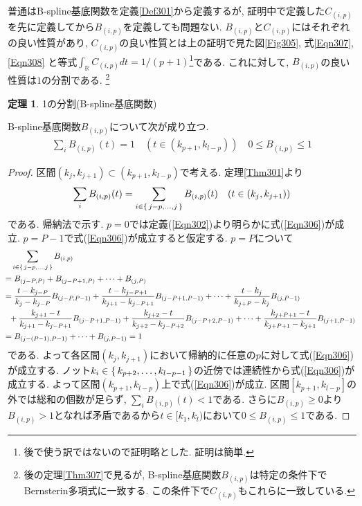 \documentclass{jsarticle}
\newcommand\setR{\mathbb{R}}
\newcommand\sfrac[2]{#1/#2}
\theoremstyle{definition}%
\newtheorem{thm}{定理}
\begin{document}
\newpage
普通はB-spline基底関数を定義\ref{Def301}から定義するが, 証明中で定義した$C_{(i,p)}$を先に定義してから$B_{(i,p)}$を定義しても問題ない.
$B_{(i,p)}$と$C_{(i,p)}$にはそれぞれの良い性質があり, $C_{(i,p)}$の良い性質とは上の証明で見た図\ref{Fig305}, 式\eqref{Eqn307}, \eqref{Eqn308} と等式$\int_\setR C_{(i,p)}dt=\sfrac{1}{(p+1)}$\footnote{後で使う訳ではないので証明略とした. 証明は簡単.}である.
これに対して, $B_{(i,p)}$の良い性質は$1$の分割である.%
\footnote{後の定理\ref{Thm307}で見るが, B-spline基底関数$B_{(i,p)}$は特定の条件下でBernsterin多項式に一致する. この条件下で$C_{(i,p)}$もこれらに一致している.}
\begin{screen}
	\begin{thm}
		\label{Thm306}
		1の分割(B-spline基底関数)

        B-spline基底関数$B_{(i,p)}$について次が成り立つ.
		\begin{align}
			\label{Eqn306}
			\sum_i B_{(i,p)}(t)= 1\quad (t\in(k_{p+1}, k_{l-p})) \quad 0\leq B_{(i,p)}\leq 1
		\end{align}
	\end{thm}
\end{screen}
\begin{proof}
	区間$(k_j,k_{j+1})\subset(k_{p+1},k_{l-p})$で考える.
	定理\ref{Thm301}より
	\begin{align}
		\sum_iB_{(i,p)}(t)
        =\sum_{i\in\set{j-p,\dots,j}}B_{(i,p)}(t)
        \quad (t\in(k_j,k_{j+1}))
	\end{align}
	である.
	帰納法で示す.
	$p=0$では定義(\ref{Eqn302})より明らかに式(\ref{Eqn306})が成立.
	$p=P-1$で式(\ref{Eqn306})が成立すると仮定する.
	$p=P$について
	\begin{align}
		\hspace{-0.78em}
		\begin{aligned}
			&\quad \sum_{i\in\set{j-p,\dots,j}}B_{(i,p)} \\
			&=B_{(j-P,P)}+B_{(j-P+1,P)}+\dots +B_{(j,P)} \\
			&=\frac{t-k_{j-P}}{k_{j}-k_{j-P}}B_{(j-P,P-1)}+\frac{t-k_{j-P+1}}{k_{j+1}-k_{j-P+1}}B_{(j-P+1,P-1)}+\dots+\frac{t-k_{j}}{k_{j+P}-k_{j}}B_{(j,P-1)} \\
			&\ \ +\frac{k_{j+1}-t}{k_{j+1}-k_{j-P+1}}B_{(j-P+1,P-1)}+\frac{k_{j+2}-t}{k_{j+2}-k_{j-P+2}}B_{(j-P+2,P-1)}+\dots+\frac{k_{j+P+1}-t}{k_{j+P+1}-k_{j+1}}B_{(j+1,P-1)}\\
			&=B_{(j-(P-1),P-1)}+\dots+B_{(j,P-1)}
			=1
		\end{aligned}
	\end{align}
	である.
	よって各区間$(k_j,k_{j+1})$において帰納的に任意の$p$に対して式(\ref{Eqn306})が成立する.
	ノット$k_{i}\in\set{k_{p+2},\dots,k_{l-p-1}}$の近傍では連続性から式(\ref{Eqn306})が成立する.
	よって区間$(k_{p+1}, k_{l-p})$上で式(\ref{Eqn306})が成立.
	区間$[k_{p+1},k_{l-p}]$の外では総和の個数が足らず, $\sum\limits_iB_{(i,p)}(t)<1$である.
	さらに$B_{(i,p)}\geq 0$より$B_{(i,p)}>1$となれば矛盾であるから$t\in[k_1, k_l)$において$0\leq B_{(i,p)}\leq 1$である.
\end{proof}
\end{document}
